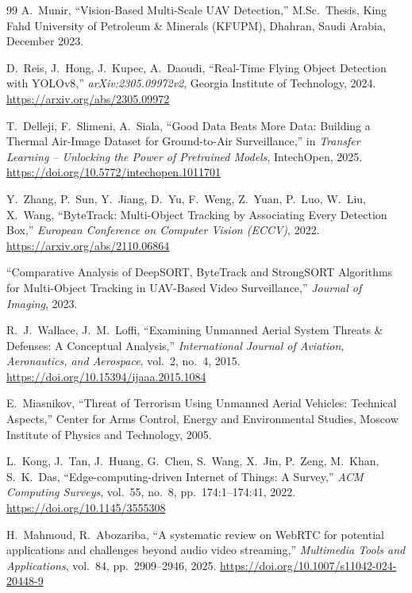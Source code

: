 \documentclass[12pt,a4paper]{report}
\begin{document}
\begin{thebibliography}{99}
A.\ Munir,
``Vision-Based Multi-Scale UAV Detection,''
M.Sc.\ Thesis, King Fahd University of Petroleum \& Minerals (KFUPM),
Dhahran, Saudi Arabia, December 2023.

D.\ Reis, J.\ Hong, J.\ Kupec, A.\ Daoudi,
``Real-Time Flying Object Detection with YOLOv8,''
\textit{arXiv:2305.09972v2}, Georgia Institute of Technology, 2024.
\url{https://arxiv.org/abs/2305.09972}

T.\ Delleji, F.\ Slimeni, A.\ Siala,
``Good Data Beats More Data: Building a Thermal Air-Image Dataset
for Ground-to-Air Surveillance,''
in \textit{Transfer Learning -- Unlocking the Power of Pretrained Models},
IntechOpen, 2025.
\url{https://doi.org/10.5772/intechopen.1011701}

Y.\ Zhang, P.\ Sun, Y.\ Jiang, D.\ Yu, F.\ Weng, Z.\ Yuan, P.\ Luo, W.\ Liu, X.\ Wang,
``ByteTrack: Multi-Object Tracking by Associating Every Detection Box,''
\textit{European Conference on Computer Vision (ECCV)}, 2022.
\url{https://arxiv.org/abs/2110.06864}

``Comparative Analysis of DeepSORT, ByteTrack and StrongSORT Algorithms
for Multi-Object Tracking in UAV-Based Video Surveillance,''
\textit{Journal of Imaging}, 2023.

R.\ J.\ Wallace, J.\ M.\ Loffi,
``Examining Unmanned Aerial System Threats \& Defenses: A Conceptual Analysis,''
\textit{International Journal of Aviation, Aeronautics, and Aerospace},
vol.\ 2, no.\ 4, 2015.
\url{https://doi.org/10.15394/ijaaa.2015.1084}

E.\ Miasnikov,
``Threat of Terrorism Using Unmanned Aerial Vehicles: Technical Aspects,''
Center for Arms Control, Energy and Environmental Studies,
Moscow Institute of Physics and Technology, 2005.

L.\ Kong, J.\ Tan, J.\ Huang, G.\ Chen, S.\ Wang, X.\ Jin, P.\ Zeng, M.\ Khan, S.\ K.\ Das,
``Edge-computing-driven Internet of Things: A Survey,''
\textit{ACM Computing Surveys}, vol.\ 55, no.\ 8, pp.\ 174:1--174:41, 2022.
\url{https://doi.org/10.1145/3555308}

H.\ Mahmoud, R.\ Abozariba,
``A systematic review on {WebRTC} for potential applications and
challenges beyond audio video streaming,''
\textit{Multimedia Tools and Applications}, vol.\ 84, pp.\ 2909--2946, 2025.
\url{https://doi.org/10.1007/s11042-024-20448-9}


\end{thebibliography}
\end{document}
